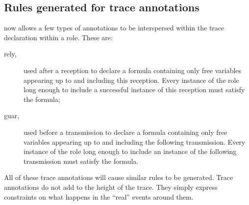 \subsection{Rules generated for trace annotations}
\label{sec:goals:rules:gen:trace}
%
{\cpsa} now allows a few types of annotations to be interspersed
within the trace declaration within a role.  These are:
%
\begin{description}
  \item[rely,]  used after a reception to
  declare a formula containing only free variables appearing up to and
  including this reception.  Every instance of the role long enough to
  include a successful instance of this reception must satisfy the
  formula;
  \item[guar,]  used before a
  transmission to declare a formula containing only free variables
  appearing up to and including the following transmission.  Every
  instance of the role long enough to include an instance of the
  following transmission must satisfy the formula.
\end{description}
%
All of these trace annotations will cause similar rules to be
generated.  %
Trace annotations do not add to the height of the trace.  They simply
express constraints on what happens in the ``real'' events around
them.

